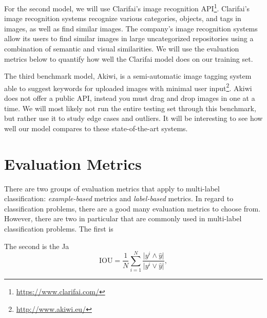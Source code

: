 \documentclass[10pt, a4paper, twocolumn]{article} %
\begin{document}
For the second model, we will use Clarifai's image recognition API\footnote{\url{https://www.clarifai.com/}}.  Clarifai’s image recognition systems recognize various categories, objects, and tags in images, as well as find similar images. The company’s image recognition systems allow its users to find similar images in large uncategorized repositories using a combination of semantic and visual similarities.  We will use the evaluation metrics below to quantify how well the Clarifai model does on our training set.

The third benchmark model, Akiwi, is a semi-automatic image tagging system able to suggest keywords for uploaded images with minimal user input\footnote{\url{http://www.akiwi.eu/}}.  Akiwi does not offer a public API, instead you must drag and drop images in one at a time. We will most likely not run the entire testing set through this benchmark, but rather use it to study edge cases and outliers. It will be interesting to see how well our model compares to these state-of-the-art systems.


\section{Evaluation Metrics} %

There are two groups of evaluation metrics that apply to multi-label classification: \textit{example-based} metrics and \textit{label-based} metrics.
In regard to classification problems, there are a good many evaluation metrics to choose from. However, there are two in particular that are commonly used in multi-label classification problems.  The first is

The second is the Ja
\begin{equation}
\mathrm{IOU} = \frac{1}{N}\sum_{i=1}^{N}\frac{\vert y^i \wedge \hat{y} \vert}{\vert y^i \vee \hat{y} \vert}, \label{eq:IOU}
\end{equation}
\end{document}
